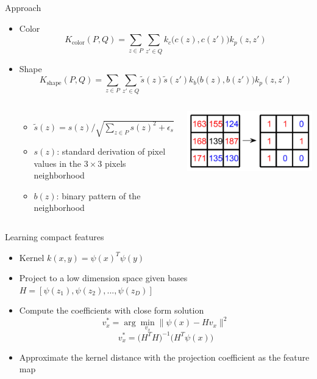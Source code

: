 \documentclass[12pt]{beamer}
\begin{document}
\begin{frame}{Approach}
    \begin{itemize}
        \item Color
            { \footnotesize \[ K_\text{color}(P, Q) = \sum_{z \in P} \sum_{z' \in Q} k_c\big(c(z), c(z')\big) k_p(z, z') \] }
        \item Shape
        { \footnotesize \[ K_\text{shape}(P, Q) = \sum_{z \in P} \sum_{z' \in Q} \tilde{s}(z) \tilde{s}(z') k_b\big(b(z), b(z')\big) k_p(z, z') \] }
        \begin{columns}
        \begin{itemize}
            \item $\tilde{s}(z) = s(z) / \sqrt{\sum_{z \in P} s(z)^2 + \epsilon_s}$
            \item $s(z)$: standard derivation of pixel values in the $3 \times 3$ pixels neighborhood
            \item $b(z)$: binary pattern of the neighborhood
        \end{itemize}
        \includegraphics[width=\textwidth]{kernel1.png}
        \end{columns}
    \end{itemize}
\end{frame}

\begin{frame}{Learning compact features}
    \begin{itemize}
        \item Kernel $k(x, y) = \psi(x)^T\psi(y)$
        \item Project to a low dimension space given bases $H = [\psi(z_1), \psi(z_2), ..., \psi(z_D)]$
        \item Compute the coefficients with close form solution
        \[ v_x^* = \arg \min_{v_x} \lVert \psi(x) - H v_x \rVert^2 \]
        \[ v_x^* = \big(H^TH\big)^{-1}\big(H^T\psi(x)\big) \]
        \item Approximate the kernel distance with the projection coefficient as the feature map
    \end{itemize}
\end{frame}
\end{document}
